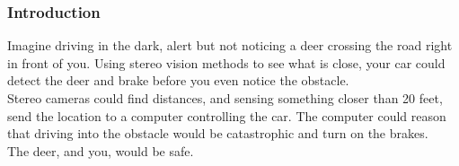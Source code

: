 \documentclass[19pt]{beamer}
\begin{document}

\begin{frame}
\frametitle{Introduction}

Imagine driving in the dark, alert but not noticing a deer crossing the road right in front of you. Using stereo vision methods to see what is close, your car could detect the deer and brake before you even notice the obstacle. \\[15pt]
%
Stereo cameras could find distances, and sensing something closer than 20 feet, send the location to a computer controlling the car. The computer could reason that driving into the obstacle would be catastrophic and turn on the brakes. \\[15pt]
%
The deer, and you, would be safe.
\end{frame}
\end{document}
